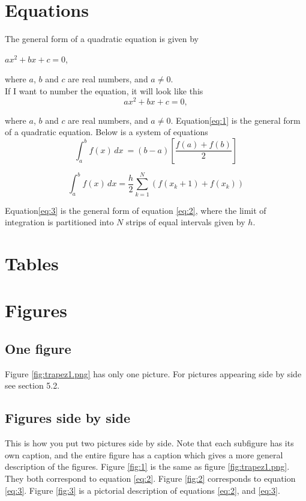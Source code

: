 \documentclass[12pt,a4paper]{article}
\begin{document}
\section{Equations}
The general form of a quadratic equation is given by\\
\begin{center}
	$ax^2 + bx +c = 0$,
\end{center}
where $a$, $b$ and $c$ are real numbers, and $a \neq0$.\\
If I want to number the equation, it will look like this\\
\begin{equation}
\label{eq:1}
ax^{2} + bx +c = 0,
\end{equation}

where $a$, $b$ and $c$ are real numbers, and $a \neq0$. Equation\ref{eq:1} is the general form of a quadratic equation. Below is a system of equations\\
\begin{equation}
\label{eq:2}
\int_{a}^{b} f(x) \,dx \ = (b-a)[\frac{f(a)+f(b)}{2}]
\end{equation}

\begin{equation}
\label{eq:3}
\int_{a}^{b} f(x) \,dx  = \frac{h}{2}\sum_{k=1}^{N}(f(x_k+1)+f(x_k)) 
\end{equation}

Equation\ref{eq:3} is the general form of equation \ref{eq:2}, where the limit of integration is partitioned into $N$ strips of equal intervals given by $h$.

\section{Tables}
\section{Figures}
\subsection{One figure}
Figure \ref{fig:trapez1.png} has only one picture. For pictures appearing side by side see section 5.2.
\subsection{Figures side by side}
This is how you put two pictures side by side. Note that each subfigure has its own caption, and the entire figure has a caption which gives a more general description of the figures. Figure \ref{fig:1} is the same as figure \ref{fig:trapez1.png}. They both correspond to equation \ref{eq:2}. Figure \ref{fig:2} corresponds to equation \ref{eq:3}. Figure \ref{fig:3} is a pictorial description of equations \ref{eq:2}, and \ref{eq:3}.\\
\end{document}
